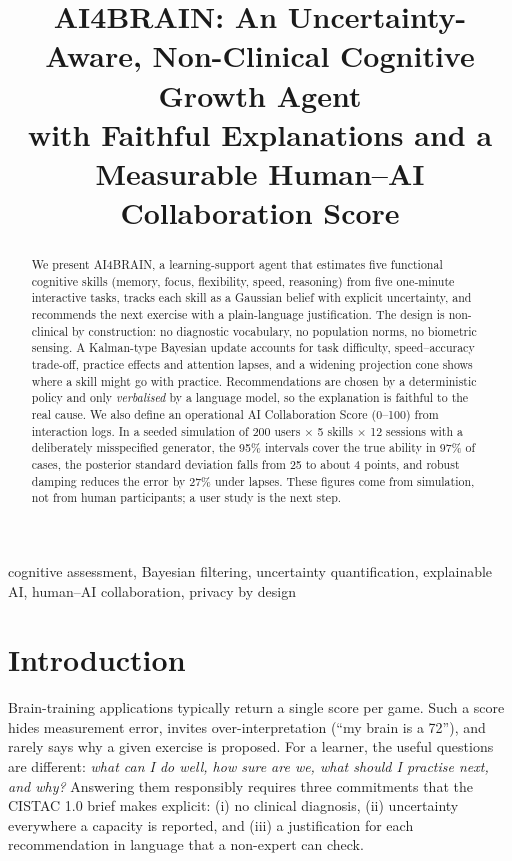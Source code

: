 \documentclass[conference]{IEEEtran}
\begin{document}
\title{AI4BRAIN: An Uncertainty-Aware, Non-Clinical Cognitive Growth Agent\\with Faithful Explanations and a Measurable Human--AI Collaboration Score}

\author{
}

\maketitle

\begin{abstract}
We present AI4BRAIN, a learning-support agent that estimates five functional cognitive skills (memory, focus, flexibility, speed, reasoning) from five one-minute interactive tasks, tracks each skill as a Gaussian belief with explicit uncertainty, and recommends the next exercise with a plain-language justification. The design is non-clinical by construction: no diagnostic vocabulary, no population norms, no biometric sensing. A Kalman-type Bayesian update accounts for task difficulty, speed--accuracy trade-off, practice effects and attention lapses, and a widening projection cone shows where a skill might go with practice. Recommendations are chosen by a deterministic policy and only \emph{verbalised} by a language model, so the explanation is faithful to the real cause. We also define an operational AI Collaboration Score (0--100) from interaction logs. In a seeded simulation of 200 users $\times$ 5 skills $\times$ 12 sessions with a deliberately misspecified generator, the 95\% intervals cover the true ability in 97\% of cases, the posterior standard deviation falls from 25 to about 4 points, and robust damping reduces the error by 27\% under lapses. These figures come from simulation, not from human participants; a user study is the next step.
\end{abstract}

\begin{IEEEkeywords}
cognitive assessment, Bayesian filtering, uncertainty quantification, explainable AI, human--AI collaboration, privacy by design
\end{IEEEkeywords}

\section{Introduction}
Brain-training applications typically return a single score per game. Such a score hides measurement error, invites over-interpretation (``my brain is a 72''), and rarely says why a given exercise is proposed. For a learner, the useful questions are different: \emph{what can I do well, how sure are we, what should I practise next, and why?} Answering them responsibly requires three commitments that the CISTAC 1.0 brief makes explicit: (i) no clinical diagnosis, (ii) uncertainty everywhere a capacity is reported, and (iii) a justification for each recommendation in language that a non-expert can check.
\end{document}

